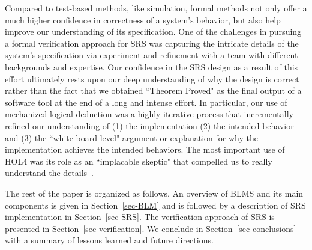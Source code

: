 \documentclass{llncs}
\begin{document}
Compared to test-based methods, like simulation, formal methods not only offer a much higher confidence in correctness of a system's behavior, but also help improve our understanding of its specification.
One of the challenges in pursuing a formal verification approach for SRS was capturing the intricate details of the system's specification via experiment and refinement with a team with different backgrounds and expertise.
Our confidence in the SRS design as a result of this effort ultimately rests upon our deep understanding of why the design is correct rather than the fact that we obtained ``Theorem Proved" as the final output of a software tool at the end of a long and intense effort.
In particular, our use of mechanized logical deduction was a highly iterative process that incrementally refined our understanding of (1) the implementation (2) the intended behavior and (3) the ``white board level" argument or explanation for why the implementation achieves the intended behaviors.
The most important use of HOL4  was its role as an ``implacable skeptic" that compelled us to really understand the details~\cite{rushby}.

The rest of the paper is organized as follows.
An overview of BLMS and its main components is given in Section~\ref{sec-BLM} and is followed by a description of SRS implementation in Section~\ref{sec-SRS}.
The verification approach of SRS is presented in Section~\ref{sec-verification}.
We conclude in Section~\ref{sec-conclusions} with a summary of lessons learned and future directions.





\end{document}

